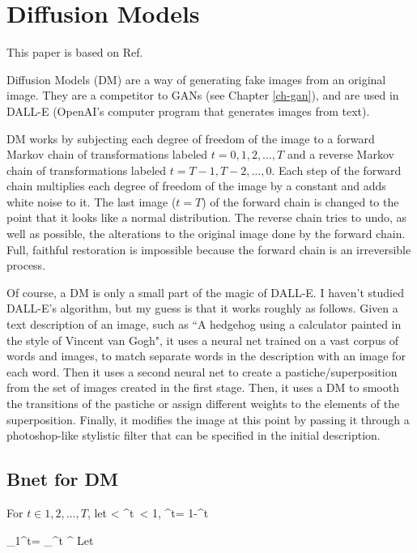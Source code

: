 \chapter{Diffusion Models}
\label{ch-diffusion}
\newcommand{\prodalp}[0]{\pi_1^t\alp}

This paper is based on
 Ref.\cite{weng-diffusion-model}

Diffusion Models (DM)
are a way of generating 
fake images from an
original image.
They are a competitor 
to GANs (see Chapter \ref{ch-gan}),
and are used in DALL-E 
(OpenAI's 
computer program
that generates images from text).


DM works by
subjecting
each degree of freedom 
of the image 
to a forward Markov
chain
of transformations
labeled $t=0, 1, 2, \ldots, T$
and a reverse Markov
chain of transformations
labeled $t=T-1, T-2, \ldots,
0$.
Each step
of the forward chain
multiplies each degree
of freedom
of the image by a constant
and adds white noise
to it.
The last  image  ($t=T$)
of the forward chain is
changed to the
point that it looks
like a normal distribution.
The reverse chain tries
to undo,
as well as possible, the alterations
to the original image
done by the forward chain.
Full, faithful restoration
is impossible
because the
forward chain
is an irreversible 
process.

Of course, a DM
is only a small part of the magic of DALL-E. I haven't
studied DALL-E's algorithm,
but my guess is that it works roughly as follows.
Given a text description
of an image, such as  
``A hedgehog using a calculator
painted
in the style of Vincent van Gogh",
it uses a neural net
trained on a vast corpus of 
words and images, to match
separate words in the description
 with an image
 for each word.
Then it uses a second neural net
to create a pastiche/superposition from
the set of images created in the first
stage. 
Then, it uses a DM
to smooth the transitions of the pastiche
or assign different
weights to the 
elements of the superposition.
Finally, it 
modifies
the image at this point
by passing it
through a 
photoshop-like stylistic filter
that can be specified
in the initial description.



\section{Bnet for DM}

For $t\in 1,2, \ldots , T$, let
< \alp^t\
< 1, \; \beta^t= 1-\alp^t
\eeq

\beq
\prodalp= \prod_{\tau=1}^t \alp^\tau
\eeq
Let 

